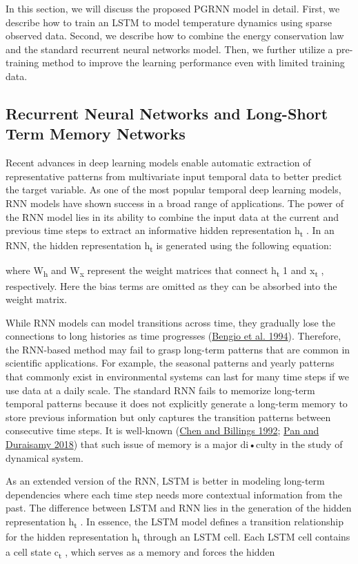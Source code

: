 \documentclass[book.tex]{subfiles}
\begin{document}
In this section, we will discuss the proposed PGRNN model in detail.
First, we describe how to train an LSTM to model temperature dynamics
using sparse observed data. Second, we describe how to combine the
energy conservation law and the standard recurrent neural networks
model. Then, we further utilize a pre-training method to improve the
learning performance even with limited training data.

\subsection{Recurrent Neural Networks and Long-Short Term Memory Networks}

Recent advances in deep learning models enable automatic extraction of representative patterns from multivariate input temporal data to better predict the target variable. As one of the most popular temporal deep learning models, RNN models have shown success in a broad range of applications. The power of the RNN model lies in its ability to combine the input data at the current and previous time steps to extract an informative hidden representation h\textsubscript{t} . In an RNN, the hidden representation h\textsubscript{t} is generated using the following equation:

where W\textsubscript{h} and W\textsubscript{x} represent the weight
matrices that connect h\textsubscript{t} 1 and x\textsubscript{t} ,
respectively. Here the bias terms are omitted as they can be absorbed
into the weight matrix.

While RNN models can model transitions across time, they gradually lose
the connections to long histories as time progresses
(\protect\hyperlink{page22}{Bengio et al. 1994}). Therefore, the
RNN-based method may fail to grasp long-term patterns that are common in
scientific applications. For example, the seasonal patterns and
yearly patterns that commonly exist in environmental systems can last for
many time steps if we use data at a daily scale. The standard RNN fails
to memorize long-term temporal patterns because it does not explicitly
generate a long-term memory to store previous information but only
captures the transition patterns between consecutive time steps. It is
well-known (\protect\hyperlink{page23}{Chen and Billings 1992};
\protect\hyperlink{page24}{Pan and} \protect\hyperlink{page24}{Duraisamy
2018}) that such issue of memory is a major di•culty in the study of
dynamical system.

As an extended version of the RNN, LSTM is better in modeling long-term
dependencies where each time step needs more contextual information from
the past. The difference between LSTM and RNN lies in the generation of
the hidden representation h\textsubscript{t} . In essence, the LSTM
model defines a transition relationship for the hidden
representation h\textsubscript{t} through an LSTM cell. Each LSTM cell
contains a cell state c\textsubscript{t} , which serves as a memory and
forces the hidden
\end{document}
